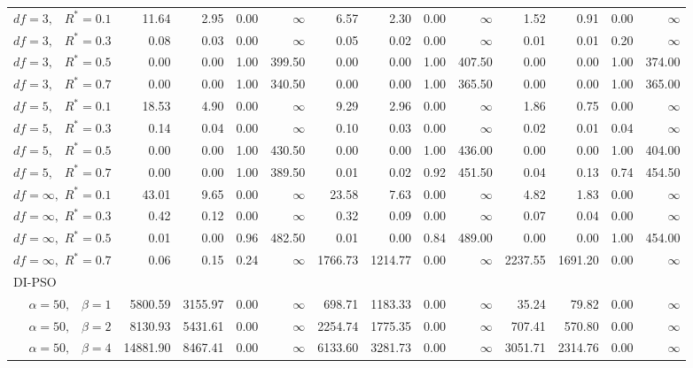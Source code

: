 \documentclass[12pt]{article}
\begin{document}
\begin{table}[ht]
{\begin{tabular}{r|rrrr|rrrr|rrrr}
  $df = 3,\enspace$ $R^* =0.1$ & 11.64 & 2.95 & 0.00 & $\infty$ & 6.57 & 2.30 & 0.00 & $\infty$ & 1.52 & 0.91 & 0.00 & $\infty$ \\ 
  $df = 3,\enspace$ $R^* =0.3$ & 0.08 & 0.03 & 0.00 & $\infty$ & 0.05 & 0.02 & 0.00 & $\infty$ & 0.01 & 0.01 & 0.20 & $\infty$ \\ 
  $df = 3,\enspace$ $R^* =0.5$ & 0.00 & 0.00 & 1.00 & 399.50 & 0.00 & 0.00 & 1.00 & 407.50 & 0.00 & 0.00 & 1.00 & 374.00 \\ 
  $df = 3,\enspace$ $R^* =0.7$ & 0.00 & 0.00 & 1.00 & 340.50 & 0.00 & 0.00 & 1.00 & 365.50 & 0.00 & 0.00 & 1.00 & 365.00 \\ 
  $df = 5,\enspace$ $R^* =0.1$ & 18.53 & 4.90 & 0.00 & $\infty$ & 9.29 & 2.96 & 0.00 & $\infty$ & 1.86 & 0.75 & 0.00 & $\infty$ \\ 
  $df = 5,\enspace$ $R^* =0.3$ & 0.14 & 0.04 & 0.00 & $\infty$ & 0.10 & 0.03 & 0.00 & $\infty$ & 0.02 & 0.01 & 0.04 & $\infty$ \\ 
  $df = 5,\enspace$ $R^* =0.5$ & 0.00 & 0.00 & 1.00 & 430.50 & 0.00 & 0.00 & 1.00 & 436.00 & 0.00 & 0.00 & 1.00 & 404.00 \\ 
  $df = 5,\enspace$ $R^* =0.7$ & 0.00 & 0.00 & 1.00 & 389.50 & 0.01 & 0.02 & 0.92 & 451.50 & 0.04 & 0.13 & 0.74 & 454.50 \\ 
  $df = \infty,$ $R^* =0.1$ & 43.01 & 9.65 & 0.00 & $\infty$ & 23.58 & 7.63 & 0.00 & $\infty$ & 4.82 & 1.83 & 0.00 & $\infty$ \\ 
  $df = \infty,$ $R^* =0.3$ & 0.42 & 0.12 & 0.00 & $\infty$ & 0.32 & 0.09 & 0.00 & $\infty$ & 0.07 & 0.04 & 0.00 & $\infty$ \\ 
  $df = \infty,$ $R^* =0.5$ & 0.01 & 0.00 & 0.96 & 482.50 & 0.01 & 0.00 & 0.84 & 489.00 & 0.00 & 0.00 & 1.00 & 454.00 \\ 
  $df = \infty,$ $R^* =0.7$ & 0.06 & 0.15 & 0.24 & $\infty$ & 1766.73 & 1214.77 & 0.00 & $\infty$ & 2237.55 & 1691.20 & 0.00 & $\infty$ \\ 
\hline
\multicolumn{1}{l|}{DI-PSO} &&&&&&&&&&&&\\
  $\alpha = 50,\enspace$ $\beta =1$ & 5800.59 & 3155.97 & 0.00 & $\infty$ & 698.71 & 1183.33 & 0.00 & $\infty$ & 35.24 & 79.82 & 0.00 & $\infty$ \\ 
  $\alpha = 50,\enspace$ $\beta =2$ & 8130.93 & 5431.61 & 0.00 & $\infty$ & 2254.74 & 1775.35 & 0.00 & $\infty$ & 707.41 & 570.80 & 0.00 & $\infty$ \\ 
  $\alpha = 50,\enspace$ $\beta =4$ & 14881.90 & 8467.41 & 0.00 & $\infty$ & 6133.60 & 3281.73 & 0.00 & $\infty$ & 3051.71 & 2314.76 & 0.00 & $\infty$ \\ 

\end{tabular}}
\end{table}
\end{document}
